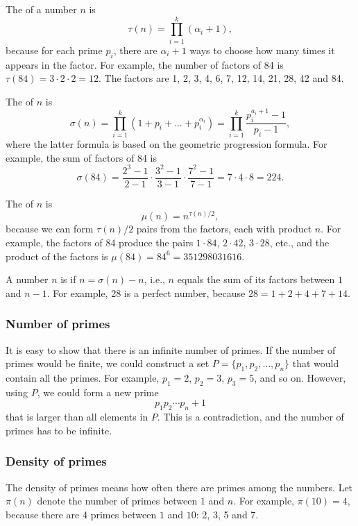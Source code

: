 The  of a number $n$ is
\[\tau(n)=\prod_{i=1}^k (\alpha_i+1),\]
because for each prime $p_i$, there are
$\alpha_i+1$ ways to choose how many times
it appears in the factor.
For example, the number of factors
of 84 is
$\tau(84)=3 \cdot 2 \cdot 2 = 12$.
The factors are
1, 2, 3, 4, 6, 7, 12, 14, 21, 28, 42 and 84.

The  of $n$ is
\[\sigma(n)=\prod_{i=1}^k (1+p_i+\ldots+p_i^{\alpha_i}) = \prod_{i=1}^k \frac{p_i^{a_i+1}-1}{p_i-1},\]
where the latter formula is based on the geometric progression formula.
For example, the sum of factors of 84 is
\[\sigma(84)=\frac{2^3-1}{2-1} \cdot \frac{3^2-1}{3-1} \cdot \frac{7^2-1}{7-1} = 7 \cdot 4 \cdot 8 = 224.\]

The  of $n$ is
\[\mu(n)=n^{\tau(n)/2},\]
because we can form $\tau(n)/2$ pairs from the factors,
each with product $n$.
For example, the factors of 84
produce the pairs
$1 \cdot 84$, $2 \cdot 42$, $3 \cdot 28$, etc.,
and the product of the factors is $\mu(84)=84^6=351298031616$.


A number $n$ is  if $n=\sigma(n)-n$,
i.e., $n$ equals the sum of its factors
between $1$ and $n-1$.
For example, 28 is a perfect number,
because $28=1+2+4+7+14$.

\subsubsection{Number of primes}

It is easy to show that there is an infinite number
of primes.
If the number of primes would be finite,
we could construct a set $P=\{p_1,p_2,\ldots,p_n\}$
that would contain all the primes.
For example, $p_1=2$, $p_2=3$, $p_3=5$, and so on.
However, using $P$, we could form a new prime
\[p_1 p_2 \cdots p_n+1\]
that is larger than all elements in $P$.
This is a contradiction, and the number of primes
has to be infinite.

\subsubsection{Density of primes}

The density of primes means how often there are primes
among the numbers.
Let $\pi(n)$ denote the number of primes between
$1$ and $n$. For example, $\pi(10)=4$, because
there are 4 primes between $1$ and $10$: 2, 3, 5 and 7.

